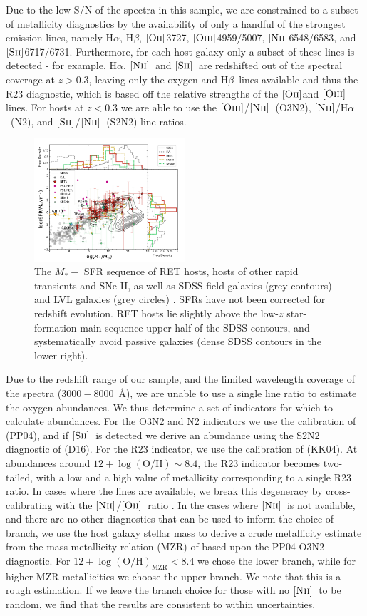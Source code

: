 \documentclass[fleqn,usenatbib,]{mnras}
\newcommand{\replyref}[1]{\color{magenta}#1 \color{black}}
\newcommand{\halpha}[0]{H$\alpha$}
\newcommand{\hbeta}[0]{H$\beta$}
\newcommand{\OII}[0]{$[\textnormal{\textsc{Oii}}]$}
\newcommand{\OIII}[0]{$[\textnormal{\textsc{Oiii}}]$}
\newcommand{\SII}[0]{$[\textnormal{\textsc{Sii}}]$}
\newcommand{\NII}[0]{$[\textnormal{\textsc{Nii}}]$}
\begin{document}
Due to the low S/N of the spectra in this sample, we are constrained to a subset of metallicity diagnostics by the availability of only a handful of the strongest emission lines, namely \halpha, \hbeta, \OII 3727, \OIII 4959/5007, \NII 6548/6583, and \SII 6717/6731. Furthermore, for each host galaxy only a subset of these lines is detected - for example, \halpha, \NII~and \SII~are redshifted out of the spectral coverage at $z>0.3$, leaving only the oxygen and \hbeta~lines available and thus the R23 diagnostic, which is based off the relative strengths of the \OII and \OIII lines. For hosts at $z<0.3$ we are able to use the \OIII /\NII~(O3N2), \NII /\halpha~(N2), and \SII /\NII~(S2N2) line ratios. 
\begin{figure}

\includegraphics[width=0.5\textwidth]{figs/SFR_Mike_RETs.png}
\caption{The $M_* -$ SFR sequence of RET hosts, hosts of other rapid transients and SNe II, as well as SDSS field galaxies (grey contours) and \replyref{LVL galaxies (grey circles)}. SFRs have not been corrected for redshift evolution. RET hosts lie slightly above the low-$z$ star-formation main sequence upper half of the SDSS contours, and systematically avoid passive galaxies (dense SDSS contours in the lower right).
\label{fig:sfms_sfr}}
\end{figure}
Due to the redshift range of our sample, and the limited wavelength coverage of the spectra ($3000-8000$~\AA), we are unable to use a single line ratio to estimate the oxygen abundances. We thus determine a set of indicators for which to calculate abundances. For the O3N2 and N2 indicators we use the calibration of \citet{Pettini2004} (PP04), and if \SII~is detected we derive an abundance using the S2N2 diagnostic of \citet{Dopita2016} (D16). For the R23 indicator, we use the calibration of \citet{Kobulnicky2004} (KK04). At abundances around $12 + \log \mathrm{(O/H)} \sim 8.4$, the R23 indicator becomes two-tailed, with a low and a high value of metallicity corresponding to a single R23 ratio. In cases where the lines are available, we break this degeneracy by cross-calibrating with the \NII/\OII~ratio \citep{Kewley2008}. In the cases where \NII~is not available, and there are no other diagnostics that can be used to inform the choice of branch, we use the host galaxy stellar mass to derive a crude metallicity estimate from the mass-metallicity relation (MZR) of \citet{Kewley2008} based upon the PP04 O3N2 diagnostic. For $12 + \log \mathrm{(O/H)}_{\mathrm{MZR}} < 8.4$ we chose the lower branch, while for higher MZR metallicities we choose the upper branch. We note that this is a rough estimation. If we leave the branch choice for those with no \NII~to be random, we find that the results are consistent to within uncertainties. 
\end{document}
